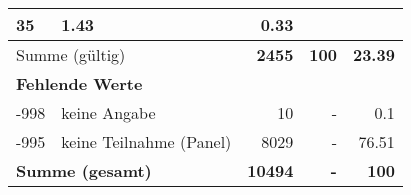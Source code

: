 \begin{longtable}{lXrrr}
       \num{35} &
       \num[round-mode=places,round-precision=2]{1.43} &
         \num[round-mode=places,round-precision=2]{0.33} \\
     \midrule
     \multicolumn{2}{l}{Summe (gültig)} &
       \textbf{\num{2455}} &
     \textbf{\num{100}} &
       \textbf{\num[round-mode=places,round-precision=2]{23.39}} \\
     \multicolumn{5}{l}{\textbf{Fehlende Werte}}\\
       -998 &
       keine Angabe &
         \num{10} &
        - &
         \num[round-mode=places,round-precision=2]{0.1} \\
       -995 &
       keine Teilnahme (Panel) &
         \num{8029} &
        - &
         \num[round-mode=places,round-precision=2]{76.51} \\
     \midrule
     \multicolumn{2}{l}{\textbf{Summe (gesamt)}} &
          \textbf{\num{10494}} &
        \textbf{-} &
        \textbf{\num{100}} \\
     \bottomrule
     \end{longtable}
     
